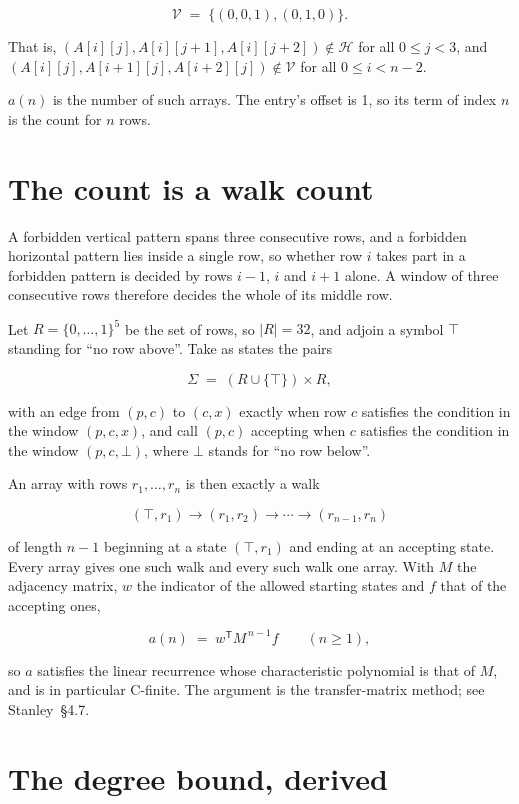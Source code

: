 \documentclass[11pt]{article}
\theoremstyle{definition}
\begin{document}
\[\mathcal{V} \;=\; \{(0,0,1), (0,1,0)\}.\]

That is, $(A[i][j],A[i][j{+}1],A[i][j{+}2]) \notin \mathcal{H}$ for all $0 \le j < 3$, and $(A[i][j],A[i{+}1][j],A[i{+}2][j]) \notin \mathcal{V}$ for all $0 \le i < n-2$.

$a(n)$ is the number of such arrays. The entry's offset is 1, so its term of index $n$ is the count for $n$ rows.

\section{The count is a walk count}

A forbidden vertical pattern spans three consecutive rows, and a forbidden horizontal pattern lies inside a single row, so whether row $i$ takes part in a forbidden pattern is decided by rows $i-1$, $i$ and $i+1$ alone. A window of three consecutive rows therefore decides the whole of its middle row.

Let $R = \{0,\dots,1\}^{5}$ be the set of rows, so $|R| = 32$, and adjoin a symbol $\top$ standing for ``no row above''. Take as states the pairs

\[\Sigma \;=\; (R \cup \{\top\}) \times R,\]

with an edge from $(p,c)$ to $(c,x)$ exactly when row $c$ satisfies the condition in the window $(p,c,x)$, and call $(p,c)$ accepting when $c$ satisfies the condition in the window $(p,c,\bot)$, where $\bot$ stands for ``no row below''.

An array with rows $r_1,\dots,r_n$ is then exactly a walk

\[(\top,r_1) \to (r_1,r_2) \to \cdots \to (r_{n-1},r_n)\]

of length $n-1$ beginning at a state $(\top,r_1)$ and ending at an accepting state. Every array gives one such walk and every such walk one array. With $M$ the adjacency matrix, $w$ the indicator of the allowed starting states and $f$ that of the accepting ones,

\[a(n) \;=\; w^{\mathsf T} M^{\,n-1} f \qquad (n \ge 1),\]

so $a$ satisfies the linear recurrence whose characteristic polynomial is that of $M$, and is in particular C-finite. The argument is the transfer-matrix method; see Stanley~\S4.7.

\section{The degree bound, derived}
\end{document}
